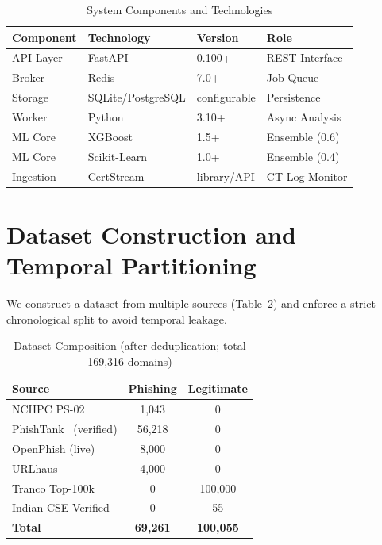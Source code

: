 \documentclass[conference]{IEEEtran}
\begin{document}
\begin{table}[htbp]
\centering
\footnotesize
\caption{System Components and Technologies}
\begin{tabularx}{\columnwidth}{@{}l l l X@{}}
\toprule
\textbf{Component} & \textbf{Technology} & \textbf{Version} & \textbf{Role} \\
\midrule
API Layer & FastAPI & 0.100+ & REST Interface \\
Broker & Redis & 7.0+ & Job Queue \\
Storage & SQLite/PostgreSQL & configurable & Persistence \\
Worker & Python & 3.10+ & Async Analysis \\
ML Core & XGBoost~\cite{xgboost} & 1.5+ & Ensemble (0.6) \\
ML Core & Scikit-Learn~\cite{pedregosa2011} & 1.0+ & Ensemble (0.4) \\
Ingestion & CertStream~\cite{certstream} & library/API & CT Log Monitor \\
\bottomrule
\end{tabularx}
\label{tab:components}
\end{table}

\section{Dataset Construction and Temporal Partitioning}
\label{sec:dataset}

We construct a dataset from multiple sources (Table~\ref{tab:dataset_sources}) and enforce a strict chronological split to avoid temporal leakage.

\begin{table}[htbp]
\centering
\small
\caption{Dataset Composition (after deduplication; total 169,316 domains)}
\begin{tabular}{lcc}
\toprule
\textbf{Source} & \textbf{Phishing} & \textbf{Legitimate} \\
\midrule
NCIIPC PS-02 & 1,043 & 0 \\
PhishTank~\cite{phishtank} (verified) & 56,218 & 0 \\
OpenPhish (live) & 8,000 & 0 \\
URLhaus & 4,000 & 0 \\
Tranco Top-100k & 0 & 100,000 \\
Indian CSE Verified & 0 & 55 \\
\textbf{Total} & \textbf{69,261} & \textbf{100,055} \\
\bottomrule
\end{tabular}
\label{tab:dataset_sources}
\end{table}
\end{document}
